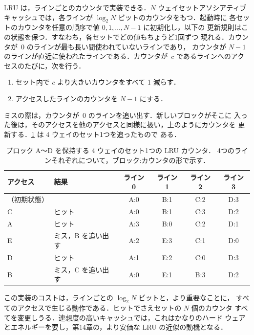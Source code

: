 \documentclass[../main.tex]{subfiles}
\begin{document}
LRU は，ラインごとのカウンタで実装できる．$N$ ウェイセットアソシアティブ
キャッシュでは，各ラインが $\log_2 N$ ビットのカウンタをもつ．起動時に
各セットのカウンタを任意の順序で値 $0, 1, \ldots, N-1$ に初期化し，以下の
更新規則はこの状態を保つ．すなわち，各セットでどの値もちょうど1回ずつ
現れる．カウンタが~0 のラインが最も長い間使われていないラインであり，
カウンタが $N-1$ のラインが直近に使われたラインである．カウンタが~$c$
であるラインへのアクセスのたびに，次を行う．
\begin{enumerate}
  \item セット内で $c$ より大きいカウンタをすべて 1 減らす．
  \item アクセスしたラインのカウンタを $N-1$ にする．
\end{enumerate}
ミスの際は，カウンタが~0 のラインを追い出す．新しいブロックがそこに
入った後は，そのアクセスを他のアクセスと同様に扱い，上のようにカウンタを
更新する．\cref{tab:l12-lru-trace} は 4 ウェイのセット1つを追ったもので
ある．

\begin{table}[htbp]
  \centering\small
  \caption{ブロック A〜D を保持する 4 ウェイのセット1つの LRU カウンタ．
    4つのラインそれぞれについて，ブロック:カウンタの形で示す．}
  \label{tab:l12-lru-trace}
  \begin{tabular}{@{}llcccc@{}}
    \toprule
    アクセス & 結果 & ライン 0 & ライン 1 & ライン 2 & ライン 3 \\
    \midrule
    （初期状態） &                     & A:0 & B:1 & C:2 & D:3 \\
    C         & ヒット              & A:0 & B:1 & C:3 & D:2 \\
    A         & ヒット              & A:3 & B:0 & C:2 & D:1 \\
    E         & ミス，B を追い出す  & A:2 & E:3 & C:1 & D:0 \\
    D         & ヒット              & A:1 & E:2 & C:0 & D:3 \\
    B         & ミス，C を追い出す  & A:0 & E:1 & B:3 & D:2 \\
    \bottomrule
  \end{tabular}
\end{table}

この実装のコストは，ラインごとの $\log_2 N$ ビットと，より重要なことに，
すべてのアクセスで生じる動作である．ヒットでさえセットの $N$ 個のカウンタ
すべてを変更しうる．連想度の高いキャッシュでは，これはかなりのハード
ウェアとエネルギーを要し，第14章の，より安価な LRU の近似の動機となる．
\end{document}
